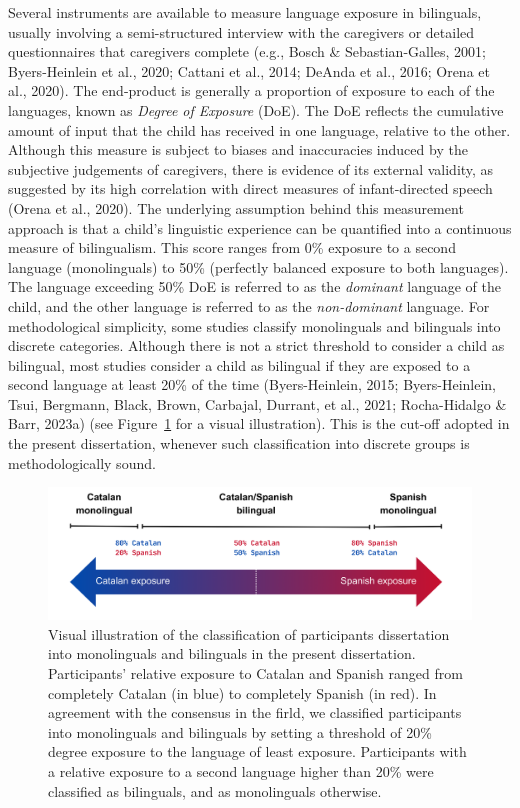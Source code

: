 \documentclass[
  12pt,
  b5paperpaper,
  twoside]{scrreprt}
\begin{document}
Several instruments are available to measure language exposure in
bilinguals, usually involving a semi-structured interview with the
caregivers or detailed questionnaires that caregivers complete (e.g.,
Bosch \& Sebastian-Galles, 2001; Byers-Heinlein et al., 2020; Cattani et
al., 2014; DeAnda et al., 2016; Orena et al., 2020). The end-product is
generally a proportion of exposure to each of the languages, known as
\emph{Degree of Exposure} (DoE). The DoE reflects the cumulative amount
of input that the child has received in one language, relative to the
other. Although this measure is subject to biases and inaccuracies
induced by the subjective judgements of caregivers, there is evidence of
its external validity, as suggested by its high correlation with direct
measures of infant-directed speech (Orena et al., 2020). The underlying
assumption behind this measurement approach is that a child's linguistic
experience can be quantified into a continuous measure of bilingualism.
This score ranges from 0\% exposure to a second language (monolinguals)
to 50\% (perfectly balanced exposure to both languages). The language
exceeding 50\% DoE is referred to as the \emph{dominant} language of the
child, and the other language is referred to as the \emph{non-dominant}
language. For methodological simplicity, some studies classify
monolinguals and bilinguals into discrete categories. Although there is
not a strict threshold to consider a child as bilingual, most studies
consider a child as bilingual if they are exposed to a second language
at least 20\% of the time (Byers-Heinlein, 2015; Byers-Heinlein, Tsui,
Bergmann, Black, Brown, Carbajal, Durrant, et al., 2021; Rocha-Hidalgo
\& Barr, 2023a) (see Figure~\ref{fig-bilingualism} for a visual
illustration). This is the cut-off adopted in the present dissertation,
whenever such classification into discrete groups is methodologically
sound.

\begin{figure}

{\centering \includegraphics{chapters/../_assets/img/bilingualism.png}

}

\caption{\label{fig-bilingualism}Visual illustration of the
classification of participants dissertation into monolinguals and
bilinguals in the present dissertation. Participants' relative exposure
to Catalan and Spanish ranged from completely Catalan (in blue) to
completely Spanish (in red). In agreement with the consensus in the
firld, we classified participants into monolinguals and bilinguals by
setting a threshold of 20\% degree exposure to the language of least
exposure. Participants with a relative exposure to a second language
higher than 20\% were classified as bilinguals, and as monolinguals
otherwise.}

\end{figure}
\end{document}
